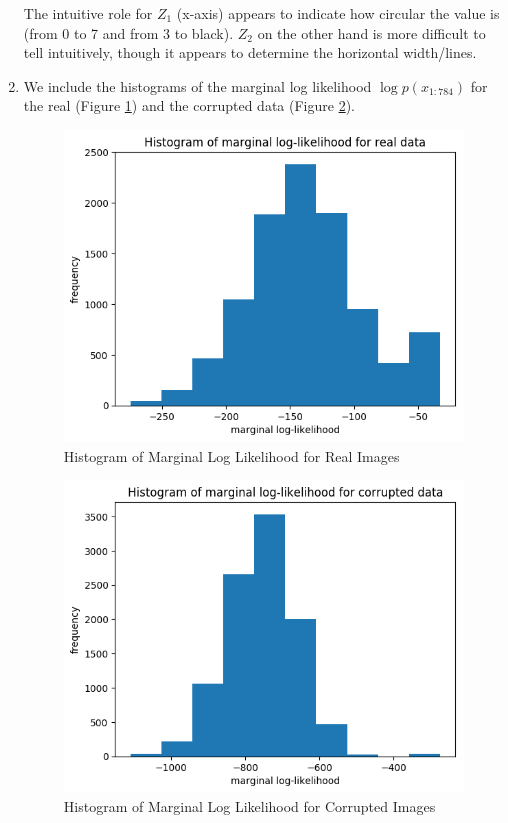 \documentclass[12pt]{article}
\begin{document}
\begin{enumerate}
The intuitive role for $Z_1$ (x-axis) appears to indicate how circular the value is (from 0 to 7 and from 3 to black). $Z_2$ on the other hand is more difficult to tell intuitively, though it appears to determine the horizontal width/lines.

\item We include the histograms of the marginal log likelihood $\log p(x_{1:784})$ for the real (Figure \ref{fig:hist_real}) and the corrupted data (Figure \ref{fig:hist_corrupted}).
\begin{figure}[h!]
\centering
\includegraphics[scale=0.8]{programming/a6_hist_real.png}
\caption{Histogram of Marginal Log Likelihood for Real Images}
\label{fig:hist_real}
\end{figure}
\begin{figure}[h!]
\centering
\includegraphics[scale=0.8]{programming/a6_hist_corrupt.png}
\caption{Histogram of Marginal Log Likelihood for Corrupted Images}
\label{fig:hist_corrupted}
\end{figure}


\end{enumerate}
\end{document}
